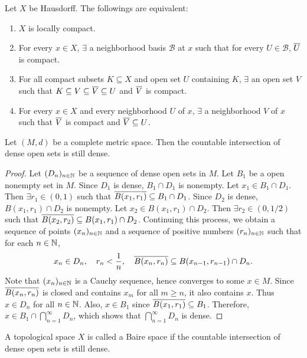 \begin{thm}
    Let $X$ be Hausdorff. The followings are equivalent:
    \begin{enumerate}
        \item $X$ is locally compact.
        \item For every $x \in X$, $\exists$ a neighborhood basis $\mathcal B$ at $x$ such that for every $U \in \mathcal B$, $\Bar{U}$ is compact.
        \item For all compact subsets $K \subseteq X$ and open set $U$ containing $K$, $\exists$ an open set $V$ such that $K \subseteq V \subseteq \Bar{V} \subseteq U$ and $\Bar{V}$ is compact.
        \item For every $x \in X$ and every neighborhood $U$ of $x$, $\exists$ a neighborhood $V$ of $x$ such that $\Bar{V}$ is compact and $\Bar{V} \subseteq U$.
    \end{enumerate}
\end{thm}

\begin{thm}
    Let $(M, d)$ be a complete metric space. Then the countable intersection of dense open sets is still dense.
    \begin{proof}
        Let $(D_n)_{n\in \N}$ be a sequence of dense open sets in $M$. Let $B_1$ be a open nonempty set in $M$. Since $D_1$ is dense, $B_1 \cap D_1$ is nonempty. Let $x_1 \in B_1 \cap D_1$. Then $\exists r_1 \in (0, 1)$ such that $\Bar{B(x_1, r_1)} \subseteq B_1 \cap D_1$. Since $D_2$ is dense, $B(x_1, r_1) \cap D_2$ is nonempty. Let $x_2 \in B(x_1, r_1) \cap D_2$. Then $\exists r_2 \in (0, 1/2)$ such that $\Bar{B(x_2, r_2)} \subseteq B(x_1, r_1) \cap D_2$. Continuing this process, we obtain a sequence of points $(x_n)_{n\in \N}$ and a sequence of positive numbers $(r_n)_{n\in \N}$ such that for each $n\in \N$,
        \[
        x_n \in D_n, \quad r_n < \frac{1}{n}, \quad \Bar{B(x_n, r_n)} \subseteq B(x_{n-1}, r_{n-1}) \cap D_n.
        \]
        Note that $(x_n)_{n\in \N}$ is a Cauchy sequence, hence converges to some $x \in M$. Since $\Bar{B(x_n, r_n)}$ is closed and contains $x_m$ for all $m \geq n$, it also contains $x$. Thus $x \in D_n$ for all $n\in \N$. Also, $x \in B_1$ since $\Bar{B(x_1, r_1)} \subseteq B_1$. Therefore, $x \in B_1 \cap \bigcap_{n=1}^\infty D_n$, which shows that $\bigcap_{n=1}^\infty D_n$ is dense.
    \end{proof}
\end{thm}

\begin{df}
    A topological space $X$ is called a Baire space if the countable intersection of dense open sets is still dense.
\end{df}

